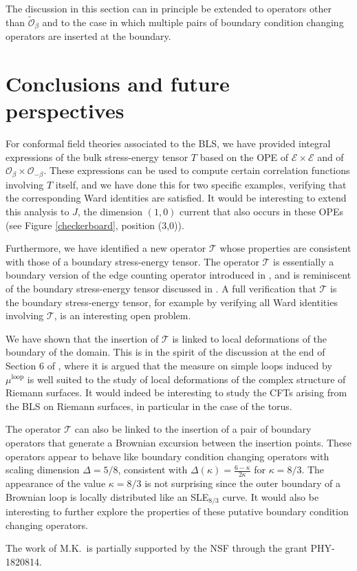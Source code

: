 \documentclass[a4paper,11pt]{article}
\begin{document}
The discussion in this section can in principle be extended to operators other than $\tilde{\mathcal{O}}_{\beta}$ and to the case in which multiple pairs of boundary condition changing operators are inserted at the boundary.

\section{Conclusions and future perspectives} \label{sec:conclusions}

For conformal field theories associated to the BLS, we have provided integral expressions of the bulk stress-energy tensor $T$ based on the OPE of $\mathcal{E} \times \mathcal{E}$ and of $\mathcal{O}_{\beta} \times \mathcal{O}_{-\beta}$. These expressions can be used to compute certain correlation functions involving $T$ itself, and we have done this for two specific examples, verifying that the corresponding Ward identities are satisfied.  It would be interesting to extend this analysis to $J$, the dimension $(1,0)$ current that also occurs in  these OPEs (see Figure \ref{checkerboard}, position (3,0)).

Furthermore, we have identified a new operator $\mathcal{T}$ whose properties are consistent with those of a boundary stress-energy tensor. The operator $\mathcal{T}$ is essentially a boundary version of the edge counting operator introduced in \cite{camia2021scalar}, and is reminiscent of the boundary stress-energy tensor discussed in \cite{FRIEDRICH2002947,Doyon_2006}. A full verification that $\mathcal{T}$ is the boundary stress-energy tensor, for example by verifying all Ward identities involving $\mathcal{T}$, is an interesting open problem.

We have shown that the insertion of $\mathcal{T}$ is linked to local deformations of the boundary of the domain. This is in the spirit of the discussion at the end of Section 6 of \cite{2005math.....11605W}, where it is argued that the measure on simple loops induced by $\mu^{\text{loop}}$ is well suited to the study of local deformations of the complex structure of Riemann surfaces. It would indeed be interesting to study the CFTs arising from the BLS on Riemann surfaces, in particular in the case of the torus.

The operator $\mathcal{T}$ can also be linked to the insertion of a pair of boundary operators that generate a Brownian excursion between the insertion points. These operators appear to behave like boundary condition changing operators with scaling dimension $\Delta=5/8$, consistent with $\Delta(\kappa)=\frac{6-\kappa}{2\kappa}$ for $\kappa=8/3$. The appearance of the value $\kappa=8/3$ is not surprising since the outer boundary of a Brownian loop is locally distributed like an SLE$_{8/3}$ curve. It would also be interesting to further explore the properties of these putative boundary condition changing operators.


\bigskip


\acknowledgments
The work of M.K.\ is partially supported by the NSF through the grant PHY-1820814.




\end{document}
